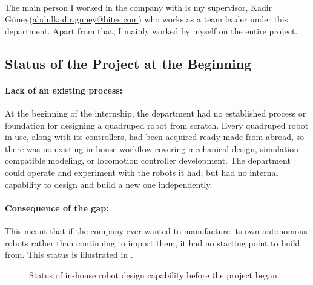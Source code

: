\documentclass[12pt]{article}
\newcommand{\rptSupervisor}{Kadir G\"uney}
\begin{document}
\paragraph{}The main person I worked in the company with is my supervisor, \rptSupervisor (\url{abdulkadir.guney@bites.com}) who works as a  team leader under this department. Apart from that, I mainly worked by myself on the entire project.

\subsection{Status of the Project at the Beginning}
\label{subsec:status-beginning}
\paragraph{Lack of an existing process:} At the beginning of the internship, the department had no established process or foundation for designing a quadruped robot from scratch. Every quadruped robot in use, along with its controllers, had been acquired ready-made from abroad, so there was no existing in-house workflow covering mechanical design, simulation-compatible modeling, or locomotion controller development. The department could operate and experiment with the robots it had, but had no internal capability to design and build a new one independently.
\paragraph{Consequence of the gap:} This meant that if the company ever wanted to manufacture its own autonomous robots rather than continuing to import them, it had no starting point to build from. This status is illustrated in .

\begin{figure}[H]
\centering
{}
\caption{Status of in-house robot design capability before the project began.}
\label{fig:status_beginning}
\end{figure}
\end{document}
